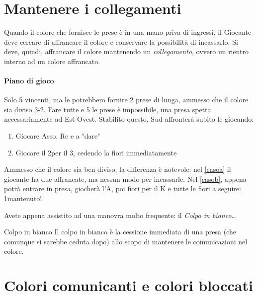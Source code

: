 \documentclass[../corsofiori.tex]{subfiles}
\begin{document}
\section{Mantenere i collegamenti}

Quando il colore che fornisce le prese è in una mano priva di ingressi, il Giocante deve cercare di affrancare il colore
e conservare la possibilità di incassarlo. Si deve, quindi, affrancare il colore mantenendo un \emph{collegamento}, ovvero un
rientro interno ad un colore affrancato.

\newgame
{}
\leftupper{\boardtext*}%
{\dealertext\quad}{\vulnertext}
\rightlower[2ex]{\lead: 4\Sp}{}{}

\showAll*

\paragraph{Piano di gioco} Solo 5 vincenti, ma le \fio potrebbero fornire 2 prese di lunga, ammesso che il colore sia
diviso 3-2. Fare tutte e 5 le prese è impossibile, una presa spetta necessariamente ad Est-Ovest. Stabilito questo, Sud
affronterà subito le \fio giocando:
\renewcommand{\itemautorefname}{Caso}
\begin{enumerate}[label=\alph*)]
    \item\label{casoa} Giocare Asso, Re e \fio a "dare"
    \item\label{casob} Giocare il 2\Cl per il 3\Cl, cedendo la fiori immediatamente
\end{enumerate}
Ammesso che il colore sia ben diviso, la differenza è notevole: nel \autoref{casoa} il giocante ha due \fio affrancate,
ma nessun modo per incassarle. Nel \autoref{casob}, appena potrà entrare in presa, giocherà l'A\Cl, poi fiori per il
K e tutte le fiori a seguire: 1\SA mantenuto!

Avete appena assistito ad una manovra molto frequente: il \emph{Colpo in bianco}\ldots

\medskip
\begin{regola}{Colpo in bianco}
    Il colpo in bianco è la cessione immediata di una presa (che comunque si sarebbe ceduta dopo) allo scopo di
    mantenere le comunicazioni nel colore.
\end{regola}


\section{Colori comunicanti e colori bloccati}
\end{document}
